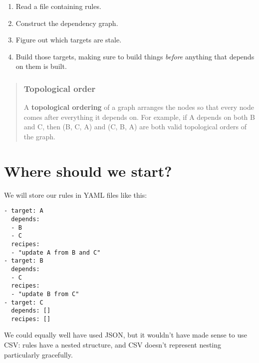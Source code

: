 \documentclass[krantzl]{krantz}
\newcommand{\glossref}[1]{\textbf{#1}}
\newenvironment{callout}{\savenotes\begin{tBox}\begin{quotation}\toggletrue{inbox}\renewcommand{\thempfootnote}{\arabic{footnote}}}{\end{quotation}\vspace{\baselineskip}\end{tBox}\togglefalse{inbox}\spewnotes}
\begin{document}
\begin{enumerate}

\item 

Read a file containing rules.



\item 

Construct the dependency graph.



\item 

Figure out which targets are stale.



\item 

Build those targets,
    making sure to build things \emph{before} anything that depends on them is built.



\end{enumerate}

\begin{callout}


\subsubsection*{Topological order}


A \glossref{topological ordering} of a graph
arranges the nodes so that every node comes after everything it depends on.
For example,
if A depends on both B and C,
then (B, C, A) and (C, B, A) are both valid topological orders of the graph.

\end{callout}

\section{Where should we start?}\label{build-manager-start}


We will store our rules in YAML files like this:


\begin{lstlisting}[frame=single,frameround=tttt]
- target: A
  depends:
  - B
  - C
  recipes:
  - "update A from B and C"
- target: B
  depends:
  - C
  recipes:
  - "update B from C"
- target: C
  depends: []
  recipes: []
\end{lstlisting}



\noindent We could equally well have used JSON,
but it wouldn't have made sense to use CSV:
rules have a nested structure,
and CSV doesn't represent nesting particularly gracefully.
\end{document}
